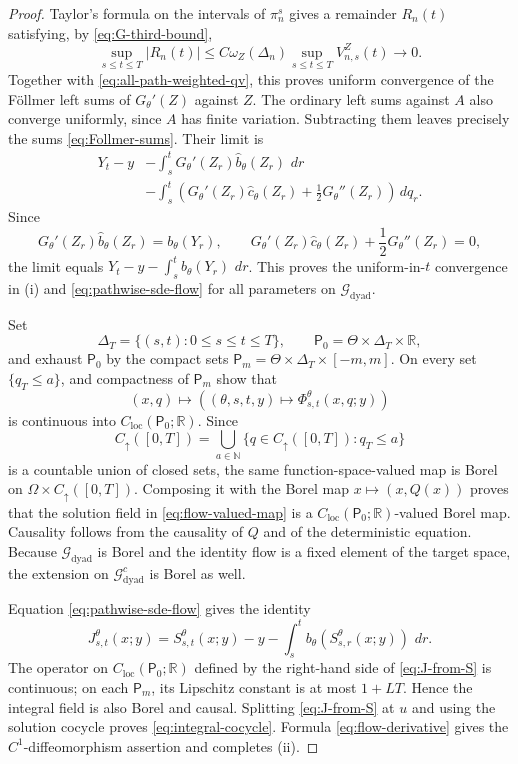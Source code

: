 \documentclass[11pt,reqno]{amsart}
\theoremstyle{plain}
\theoremstyle{definition}
\newcommand{\R}{\mathbb R}
\newcommand{\N}{\mathbb N}
\newcommand{\cG}{\mathcal G}
\newcommand{\dd}{\,d}
\newcommand{\abs}[1]{\left\lvert #1\right\rvert}
\begin{document}
\begin{proof}
Taylor's formula on the intervals of \(\pi_n^s\) gives a remainder
\(R_n(t)\) satisfying, by \eqref{eq:G-third-bound},
\[
  \sup_{s\le t\le T}\abs{R_n(t)}
  \le
  C\omega_Z(\Delta_n)
   \sup_{s\le t\le T}V_{n,s}^Z(t)
  \longrightarrow0.
\]
Together with \eqref{eq:all-path-weighted-qv}, this proves uniform convergence
of the F\"ollmer left sums of \(G_\theta'(Z)\) against \(Z\).  The ordinary
left sums against \(A\) also converge uniformly, since \(A\) has finite
variation.  Subtracting them leaves precisely the sums
\eqref{eq:Follmer-sums}.  Their limit is
\begin{align*}
  Y_t-y
  &-\int_s^tG_\theta'(Z_r)\widehat b_\theta(Z_r)\,\dd r\\
  &-\int_s^t
    \left(
      G_\theta'(Z_r)\widehat c_\theta(Z_r)
      +\frac12G_\theta''(Z_r)
    \right)\dd q_r.
\end{align*}
Since
\[
  G_\theta'(Z_r)\widehat b_\theta(Z_r)
    =b_\theta(Y_r),
  \qquad
  G_\theta'(Z_r)\widehat c_\theta(Z_r)
    +\frac12G_\theta''(Z_r)=0,
\]
the limit equals \(Y_t-y-\int_s^t b_\theta(Y_r)\,\dd r\).  This proves the
uniform-in-\(t\) convergence in (i) and \eqref{eq:pathwise-sde-flow} for all
parameters on \(\cG_{\mathrm{dyad}}\).

Set
\[
  \Delta_T=\{(s,t):0\le s\le t\le T\},
  \qquad
  \mathsf P_0=\Theta\times\Delta_T\times\R,
\]
and exhaust \(\mathsf P_0\) by the compact sets
\(\mathsf P_m=\Theta\times\Delta_T\times[-m,m]\).  On every set
\(\{q_T\le a\}\),  and compactness of
\(\mathsf P_m\) show that
\[
  (x,q)\longmapsto
  \left(
    (\theta,s,t,y)\longmapsto\Phi_{s,t}^\theta(x,q;y)
  \right)
\]
is continuous into \(C_{\mathrm{loc}}(\mathsf P_0;\R)\).  Since
\[
  C_\uparrow([0,T])
  =\bigcup_{a\in\N}\{q\in C_\uparrow([0,T]):q_T\le a\}
\]
is a countable union of closed sets, the same function-space-valued map is
Borel on \(\Omega\times C_\uparrow([0,T])\).  Composing it with the Borel
map \(x\mapsto(x,Q(x))\) proves that the solution field in
\eqref{eq:flow-valued-map} is a
\(C_{\mathrm{loc}}(\mathsf P_0;\R)\)-valued Borel map.  Causality follows
from the causality of \(Q\) and of the deterministic equation.
Because \(\cG_{\mathrm{dyad}}\) is Borel and the identity flow is a fixed
element of the target space, the extension on \(\cG_{\mathrm{dyad}}^c\) is
Borel as well.

Equation \eqref{eq:pathwise-sde-flow} gives the identity
\begin{equation}\label{eq:J-from-S}
  J_{s,t}^\theta(x;y)
  =S_{s,t}^\theta(x;y)-y
   -\int_s^t b_\theta(S_{s,r}^\theta(x;y))\,\dd r.
\end{equation}
The operator on \(C_{\mathrm{loc}}(\mathsf P_0;\R)\) defined by the
right-hand side of \eqref{eq:J-from-S} is continuous; on each
\(\mathsf P_m\), its Lipschitz constant is at most \(1+LT\).  Hence the
integral field is also Borel and causal.  Splitting
\eqref{eq:J-from-S} at \(u\) and using the solution cocycle proves
\eqref{eq:integral-cocycle}.  Formula
\eqref{eq:flow-derivative} gives the \(C^1\)-diffeomorphism assertion and
completes (ii).


\end{proof}
\end{document}
